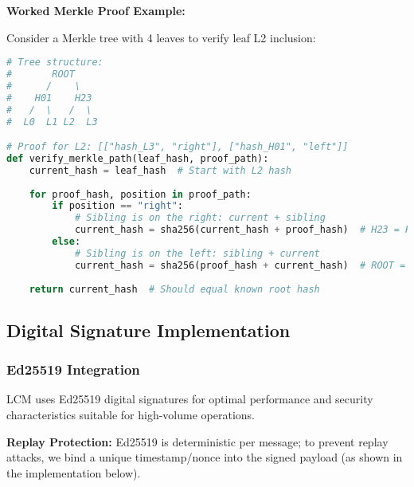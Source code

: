 \documentclass[12pt,a4paper]{article}
\begin{document}
\textbf{Worked Merkle Proof Example:}

Consider a Merkle tree with 4 leaves to verify leaf L2 inclusion:

\begin{lstlisting}[language=Python, caption=Merkle Proof Verification Example]
# Tree structure: 
#       ROOT
#      /    \
#    H01    H23
#   /  \   /  \
#  L0  L1 L2  L3

# Proof for L2: [["hash_L3", "right"], ["hash_H01", "left"]]
def verify_merkle_path(leaf_hash, proof_path):
    current_hash = leaf_hash  # Start with L2 hash
    
    for proof_hash, position in proof_path:
        if position == "right":
            # Sibling is on the right: current + sibling
            current_hash = sha256(current_hash + proof_hash)  # H23 = H(L2 + L3)
        else:
            # Sibling is on the left: sibling + current  
            current_hash = sha256(proof_hash + current_hash)  # ROOT = H(H01 + H23)
    
    return current_hash  # Should equal known root hash
\end{lstlisting}

\subsection{Digital Signature Implementation}

\subsubsection{Ed25519 Integration}

LCM uses Ed25519 digital signatures for optimal performance and security characteristics suitable for high-volume operations.

\textbf{Replay Protection:} Ed25519 is deterministic per message; to prevent replay attacks, we bind a unique timestamp/nonce into the signed payload (as shown in the implementation below).
\end{document}
